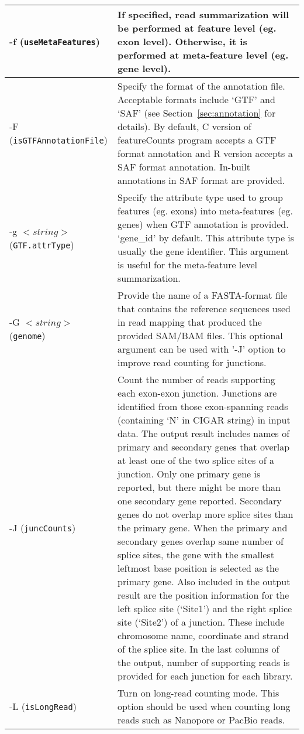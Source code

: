 \documentclass[12pt]{report}
\newcommand{\code}[1]{{\small\texttt{#1}}}
\newcommand{\featureCounts}{\textsf{featureCounts}}
\newcommand{\C}{\textsf{C}}
\begin{document}
\begin{longtable}{|p{5cm}|p{11cm}|}
\hline
-f \newline (\code{useMetaFeatures}) & If specified, read summarization will be performed at feature level (eg. exon level). Otherwise, it is performed at meta-feature level (eg. gene level).\\
\hline
-F \newline (\code{isGTFAnnotationFile}) & Specify the format of the annotation file. Acceptable formats include `GTF' and `SAF' (see Section~\ref{sec:annotation} for details). By default, {\C} version of {\featureCounts} program accepts a GTF format annotation and R version accepts a SAF format annotation. In-built annotations in SAF format are provided.\\
\hline
-g $<string>$ \newline (\code{GTF.attrType}) & Specify the attribute type used to group features (eg. exons) into meta-features (eg. genes) when GTF annotation is provided. `gene\_id' by default. This attribute type is usually the gene identifier. This argument is useful for the meta-feature level summarization.\\
\hline
-G $<string>$ \newline (\code{genome}) & Provide the name of a FASTA-format file that contains the reference sequences used in
read mapping that produced the provided SAM/BAM files. This optional argument can be used with '-J' option to improve read counting for junctions.\\
\hline
-J \newline (\code{juncCounts}) & Count the number of reads supporting each exon-exon junction. Junctions are identified from those exon-spanning reads (containing `N' in CIGAR string) in input data. The output result includes names of primary and secondary genes that overlap at least one of the two splice sites of a junction. Only one primary gene is reported, but there might be more than one secondary gene reported. Secondary genes do not overlap more splice sites than the primary gene. When the primary and secondary genes overlap same number of splice sites, the gene with the smallest leftmost base position is selected as the primary gene. Also included in the output result are the position information for the left splice site (`Site1') and the right splice site (`Site2') of a junction. These include chromosome name, coordinate and strand of the splice site. In the last columns of the output, number of supporting reads is provided for each junction for each library.\\
\hline
-L \newline (\code{isLongRead}) & Turn on long-read counting mode. This option should be used when counting long reads such as Nanopore or PacBio reads.\\

\end{longtable}
\end{document}
